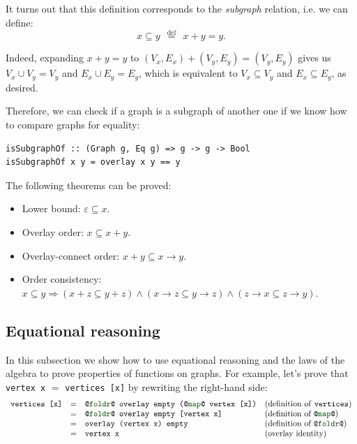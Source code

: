 \documentclass[acmlarge,anonymous]{acmart}\settopmatter{printfolios=true}
\newcommand{\hs}{\texttt}
\newcommand{\defeq}{\stackrel{\text{def}}{=}}
\newcommand{\std}[1]{{\color[rgb]{0,0.3,0} #1}}
\begin{document}
\noindent
It turns out that this definition corresponds to the \emph{subgraph} relation,
i.e. we can define:
\[
x \subseteq y~~\defeq~~x + y = y.
\]

\noindent
Indeed, expanding $x + y = y$ to $(V_x,E_x) + (V_y,E_y) = (V_y,E_y)$ gives us
$V_x \cup V_y = V_y$ and $E_x \cup E_y = E_y$, which is equivalent to
$V_x \subseteq V_y$ and $E_x \subseteq E_y$, as desired.

Therefore, we can check if a graph is a subgraph of another one if we know how to
compare graphs for equality:
\begin{verbatim}
isSubgraphOf :: (Graph g, Eq g) => g -> g -> Bool
isSubgraphOf x y = overlay x y == y
\end{verbatim}

The following theorems can be proved:

\begin{itemize}
    \item Lower bound: $\varepsilon \subseteq x$.
    \item Overlay order: $x \subseteq x + y$.
    \item Overlay-connect order: $x + y \subseteq x \rightarrow y$.
    \item Order consistency: $x \subseteq y \Rightarrow (x + z \subseteq y + z)
    \wedge (x \rightarrow z \subseteq y \rightarrow z)
    \wedge (z \rightarrow x \subseteq z \rightarrow y)$.

\end{itemize}

\subsection{Equational reasoning}\label{sub-reasoning}

In this subsection we show how to use equational reasoning and the laws
of the algebra to prove properties of functions on graphs.
For example, let's prove that \hs{vertex x} $=$ \hs{vertices [x]} by rewriting
the right-hand side:
\[
\begin{array}{rcll}
\hs{vertices [x]} & = & \hs{@\std{foldr}@ overlay empty (@\std{map}@ vertex [x])} & \text{(definition of \hs{vertices})}\\
 & = & \hs{@\std{foldr}@ overlay empty [vertex x]} & \text{(definition of }\hs{@\std{map}@}\text{)}\\
 & = & \hs{overlay (vertex x) empty} & \text{(definition of }\hs{@\std{foldr}@}\text{)}\\
 & = & \hs{vertex x} & \text{(overlay identity)}\\
\end{array}
\]
\end{document}
